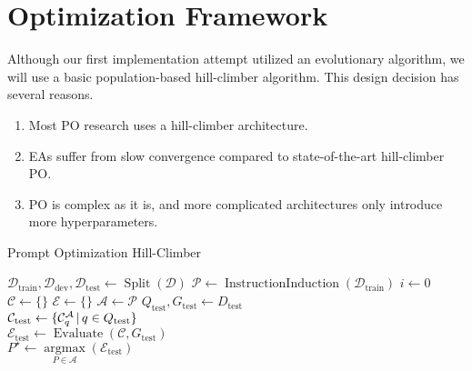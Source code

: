 \section{Optimization Framework}
Although our first implementation attempt utilized an evolutionary algorithm, we will use a basic population-based hill-climber algorithm.
This design decision has several reasons.
\begin{enumerate}
    \item Most PO research uses a hill-climber architecture.
    \item EAs suffer from slow convergence compared to state-of-the-art hill-climber PO\cite{xiang2025selfsupervisedpromptoptimization}.
    \item PO is complex as it is, and more complicated architectures only introduce more hyperparameters.
\end{enumerate}


\begin{algorithm}
    \caption{Prompt Optimization Hill-Climber}
    \label{alg:promptoptimloop}
    $\mathcal{D}_{\text{train}}, \mathcal{D}_{\text{dev}}, \mathcal{D}_{\text{test}} \gets \operatorname{Split}(\mathcal{D})$ 
    $\mathcal{P} \gets \operatorname{InstructionInduction}(\mathcal{D}_{\text{train}})$ 
    $i \gets 0$ 
    $\mathcal{C} \gets \{\}$  
    $\mathcal{E} \gets \{\}$ 
    $\mathcal{A} \gets \mathcal{P}$ 
    $Q_{\text{test}}, G_{\text{test}} \gets D_{\text{test}}$\\
    $\mathcal{C}_{\text{test}} \gets \{\mathcal{C}_{q}^{\mathcal{A}}\, \vert \, q \in Q_{\text{test}}\}$\\
    $\mathcal{E}_{\text{test}} \gets \operatorname{Evaluate}(\mathcal{C}, G_{\text{test}})$\\
    $P^{\star} \gets \underset{P\in\mathcal{A}}{\operatorname{argmax}}(\mathcal{E}_{\text{test}})$\\
\end{algorithm}

